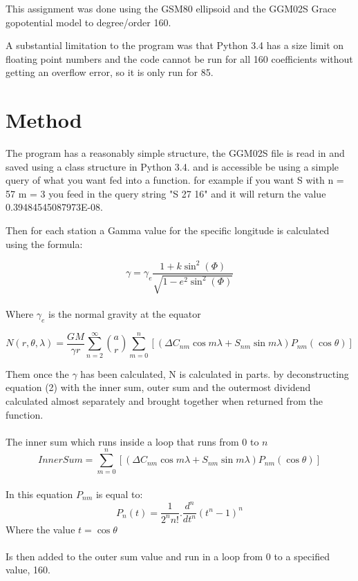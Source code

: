 \documentclass[12pt,a4paper]{article}
\begin{document}
	This assignment was done using the GSM80 ellipsoid and the GGM02S Grace gopotential model to degree/order 160.
	
	A substantial limitation to the program was that Python 3.4 has a size limit on floating point numbers and the code cannot be run for all 160 coefficients without getting an overflow error, so it is only run for 85.
	
	\newpage
	\section{Method}
	
	The program has a reasonably simple structure, the GGM02S file is read in and saved using a class structure in Python 3.4. and is accessible be using a simple query of what you want fed into a function. for example if you want S with n = 57 m = 3 you feed in the query string "S 27 16" and it will return the value 0.39484545087973E-08.
	
	Then for each station a Gamma value for the specific longitude is calculated using the formula:
	
	\begin{equation}
		\gamma = \gamma_e  \frac{1 + k \sin^2(\Phi)}{\sqrt{1 - e^2 \sin^2(\Phi)}}
	\end{equation}
	\\
	Where $\gamma_e$ is the normal gravity at the equator
	
	\begin{equation}
		N(r, \theta, \lambda) = \frac{GM}{\gamma r} \sum_{n=2}^{\infty} \binom{a}{r} \sum_{m=0}^{n} [(\Delta C_{nm} \cos m\lambda + S_{nm}\sin m\lambda) P_{nm}(\cos\theta)]
	\end{equation}
		
	Them once the $\gamma$ has been calculated, N is calculated in parts. by deconstructing equation (2)  with the inner sum, outer sum and the outermost dividend calculated almost separately and brought together when returned from the function.\\
	\\
	The inner sum which runs inside a loop that runs from 0 to $n$
	\begin{equation}
		InnerSum = \sum_{m=0}^{n} [(\Delta C_{nm} \cos m\lambda + S_{nm}\sin m\lambda) P_{nm}(\cos\theta)]
	\end{equation}
	\\
	In this equation $P_{nm}$ is equal to:
	\begin{equation}
		P_n(t) = \frac{1}{2^n n!} . \frac{d^n}{dt^n} (t^n - 1)^n
	\end{equation}
	Where the value $t = \cos\theta$\\
	\\
	Is then added to the outer sum value and run in a loop from 0 to a specified value, 160.
	
\end{document}
